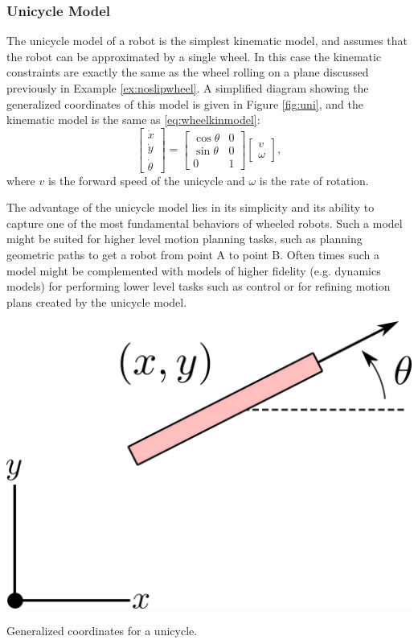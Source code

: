 \subsubsection{Unicycle Model} \label{subsubsec:uni}
The unicycle model of a robot is the simplest kinematic model, and assumes that the robot can be approximated by a single wheel. In this case the kinematic constraints are exactly the same as the wheel rolling on a plane discussed previously in Example \ref{ex:noslipwheel}. A simplified diagram showing the generalized coordinates of this model is given in Figure \ref{fig:uni}, and the kinematic model is the same as \eqref{eq:wheelkinmodel}:
\begin{equation} \label{eq:uni}
\begin{bmatrix}
\dot{x} \\ \dot{y} \\ \dot{\theta}
\end{bmatrix} = \begin{bmatrix}
\cos \theta & 0 \\
\sin\theta & 0 \\
0 & 1
\end{bmatrix}\begin{bmatrix}
v \\ \omega
\end{bmatrix},
\end{equation}
where $v$ is the forward speed of the unicycle and $\omega$ is the rate of rotation.

The advantage of the unicycle model lies in its simplicity and its ability to capture one of the most fundamental behaviors of wheeled robots. Such a model might be suited for higher level motion planning tasks, such as planning geometric paths to get a robot from point A to point B. Often times such a model might be complemented with models of higher fidelity (e.g. dynamics models) for performing lower level tasks such as control or for refining motion plans created by the unicycle model.
\begin{marginfigure}
    \centering 
    \includegraphics[width=0.8\linewidth]{tex/figs/ch01_figs/unicycle.png}
    \caption{Generalized coordinates for a unicycle.}
    \label{fig:uni} 
\end{marginfigure} 


